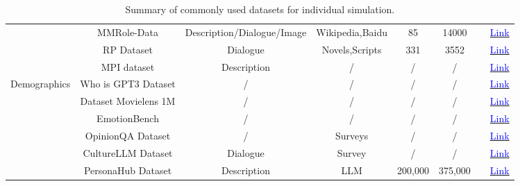 \begin{table}[!htp]
{{\begin{tabular}{c|c|c|c|c|c|c|c}
\cline{2-8}
   & MMRole-Data & Description/Dialogue/Image & Wikipedia,Baidu & 85 & 14000 & \cite{dai2024mmrolecomprehensiveframeworkdeveloping} & \href{https://huggingface.co/datasets/YanqiDai/MMRole_dataset}{\textcolor{blue}{Link}} \\
\cline{2-8}
   & RP Dataset & Dialogue & Novels,Scripts & 331 & 3552 & \cite{yu2024dialogueprofiledialoguealignmentframework} & \href{https://github.com/yuyouyu32/BeyondDialogue}{\textcolor{blue}{Link}} \\
\cline{2-8}
    & MPI dataset & Description & /  & /   & /  & \cite{jiang2023evaluatinginducingpersonalitypretrained} & \href{https://github.com/jianggy/MPI/tree/main/inventories}{\textcolor{blue}{Link}} \\
\hline
\multirow{7}{*}{Demographics} & Who is GPT3 Dataset & /  & /  & /  & /  & \cite{miotto2022gpt3explorationpersonalityvalues} & \href{https://github.com/ben-aaron188/}{\textcolor{blue}{Link}} \\
\cline{2-8}
& Dataset Movielens 1M & /  & /  & /  & /  & \cite{wang2024userbehaviorsimulationlarge} & \href{https://grouplens.org/datasets/movielens/1m/}{\textcolor{blue}{Link}} \\
\cline{2-8}
    & EmotionBench & /  & /  & /  & /  & \cite{huang2024emotionallynumbempatheticevaluating} & \href{https://github.com/CUHK-ARISE/EmotionBench}{\textcolor{blue}{Link}} \\
\cline{2-8}
    & OpinionQA Dataset & /  & Surveys & /  & /  & \cite{li2024steerabilitylargelanguagemodels} & \href{https://github.com/tatsu-lab/opinions_qa}{\textcolor{blue}{Link}} \\
\cline{2-8}
    & CultureLLM Dataset & Dialogue & Survey & /  & /  & \cite{li2024culturellmincorporatingculturaldifferences} & \href{https://github.com/Scarelette/CultureLLM}{\textcolor{blue}{Link}} \\
\cline{2-8}
    & PersonaHub Dataset & Description & LLM & 200,000 & 375,000 & \cite{ge2024scalingsyntheticdatacreation} & \href{https://github.com/tencent-ailab/persona-hub}{\textcolor{blue}{Link}} \\

\bottomrule
\end{tabular}}
}
\vspace{-3mm}
\caption{Summary of commonly used datasets for individual simulation.}
\label{tab:indi_data}
\end{table}
